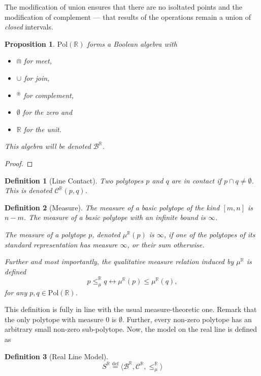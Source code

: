\documentclass{article}
\newtheorem*{definition}{Definition}
\newtheorem*{proposition}{Proposition}
\newcommand{\R}{\mathbb{R}}
\newcommand{\B}{\mathcal{B}}
\newcommand{\bcup}{\cup}
\newcommand{\bcap}{\Cap}
\newcommand{\bstar}{^\circledast}
\newcommand{\bcont}{\mathcal{C}^\R}
\newcommand{\bmeasure}{\leq_\mu^\R}
\newcommand{\Pol}{\text{Pol}}
\newcommand{\eqdef}{\stackrel{\text{def}}{=}}
\begin{document}
The modification of union ensures that there are no isoltated points and the modification of complement --- that results of the operations remain a union of \emph{closed} intervals.

\begin{proposition}
$\Pol(\R)$ forms a Boolean algebra with
\begin{itemize}
  \item $\bcap$ for meet,
  \item $\bcup$ for join,
  \item $\bstar$ for complement,
  \item $\emptyset$ for the zero and
  \item $\R$ for the unit.
\end{itemize}
This algebra will be denoted $\B^\R$.
\end{proposition}
\begin{proof}
\end{proof}

\begin{definition}[Line Contact]
Two polytopes $p$ and $q$ are \emph{in contact} if $p \cap q \neq \emptyset$. This is denoted $\bcont(p, q)$.
\end{definition}

\begin{definition}[Measure]
  The measure of a basic polytope of the kind $[m, n]$ is $n-m$. The measure of a basic polytope with an infinite bound is $\infty$.

  The \emph{measure} of a polytope $p$, denoted $\mu^\R(p)$ is $\infty$, if one of the polytopes of its standard representation has measure $\infty$, or their sum otherwise.

Further and most importantly, the \emph{qualitative measure relation induced by} $\mu^\R$ is defined
\begin{equation*}
  p \bmeasure q \longleftrightarrow \mu^\R(p) \leq \mu^\R(q),
\end{equation*}
  for any $p, q \in \Pol(\R)$.
\end{definition}

This definition is fully in line with the usual measure-theoretic one. Remark that the only polytope with measure $0$ is $\emptyset$. Further, every non-zero polytope has an arbitrary small non-zero sub-polytope.
Now, the model on the real line is defined as
\begin{definition}[Real Line Model]
  \begin{equation*}
    S^\R \eqdef \langle \B^\R, \bcont, \bmeasure \rangle
  \end{equation*}
\end{definition}
\end{document}
